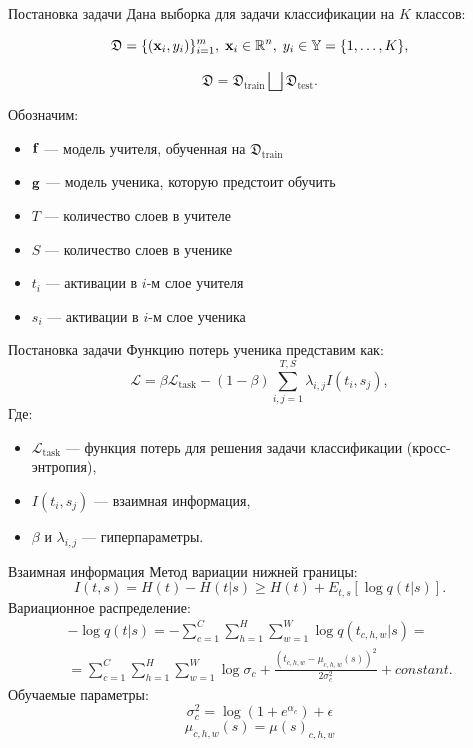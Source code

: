 \documentclass{beamer}
\begin{document}
\begin{frame}{Постановка задачи}
    Дана выборка для задачи классификации на $K$ классов:

    $$\mathfrak{D}  = \{(\bold{x}_i, y_i)\}_{i=1}^{m},\; \bold{x}_i \in \mathbb{R}^n,\; y_i \in \mathbb{Y}  = \{1, \dots, K\},$$

    $$\mathfrak{D} = \mathfrak{D}_\text{train} \bigsqcup \mathfrak{D}_\text{test}.$$

    Обозначим:
    \begin{itemize}
        \item $\bold{f}$ --- модель учителя, обученная на $\mathfrak{D}_\text{train}$
        \item $\bold{g}$ --- модель ученика, которую предстоит обучить
        \item $T$ --- количество слоев в учителе
        \item $S$ --- количество слоев в ученике
        \item $t_i$ --- активации в $i$-м слое учителя
        \item $s_i$ --- активации в $i$-м слое ученика
    \end{itemize}
\end{frame}



\begin{frame}{Постановка задачи}
    Функцию потерь ученика представим как:
    $$
        \mathcal{L} = \beta \mathcal{L}_\text{task} - (1 - \beta){\sum_{i, j=1}^{T, S}\lambda_{i, j}I(t_{i}, s_{j})},
    $$
    Где:
    \begin{itemize}
        \item $\mathcal{L}_\text{task}$ --- функция потерь для решения задачи классификации (кросс-энтропия),
        \item $I(t_{i}, s_{j})$ --- взаимная информация,
        \item $\beta$ и $\lambda_{i, j}$ --- гиперпараметры.
    \end{itemize}
\end{frame}


\begin{frame}{Взаимная информация}
    Метод вариации нижней границы:
    \begin{equation}
        I(t, s) = H(t) - H(t|s) \geq  H(t) + E_{t,s}[\log{q(t|s)}].
    \end{equation}
    Вариационное распределение:
    \begin{multline}
        -\log{q(t|s)} = -\sum_{c=1}^{C}  \sum_{h=1}^{H} \sum_{w=1}^{W} \log{q(t_{c,h,w}|s)} = \\
        = \sum_{c=1}^{C}  \sum_{h=1}^{H} \sum_{w=1}^{W} \log{\sigma_c} + \frac{(t_{c,h,w} - \mu_{c,h,w}(s))^2}{2\sigma_c^2} + constant.
    \end{multline}
    Обучаемые параметры:
    $$\sigma^2_c = \log{(1 + e^{\alpha_c})} + \epsilon$$
    $$\mu_{c,h,w}(s) = \mu(s)_{c,h,w}$$
\end{frame}
\end{document}

